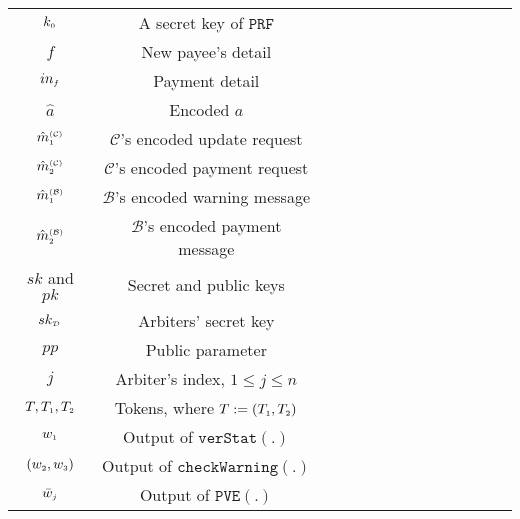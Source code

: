 \begin{table*}[!htbp]
\begin{scriptsize}
\begin{center}
{{\begin{tabular}{|c|c|c|c|c|c|c|c|c|c|c|c|c|c|}
\cellcolor{gray!20}\scriptsize$ k_{\scriptscriptstyle 0}$ &\cellcolor{gray!20}\scriptsize   A secret key of $\mathtt{PRF}$\\ 
%               
\cellcolor{white!20}\scriptsize$f$ &\cellcolor{white!20}\scriptsize New payee’s detail  \\ 
\cellcolor{gray!20}\scriptsize$in_{\scriptscriptstyle f}$ &\cellcolor{gray!20}\scriptsize Payment detail \\ 
%
  \cellcolor{white!20}\scriptsize$\hat a$ &\cellcolor{white!20}\scriptsize Encoded $a$ \\     
%
\cellcolor{gray!20}\scriptsize$\hat {m}^{\scriptscriptstyle(\mathcal{C})}_{\scriptscriptstyle 1}$ &\cellcolor{gray!20}\scriptsize $\mathcal{C}$'s encoded update request\\     
%
\cellcolor{white!20}\scriptsize$\hat {m}^{\scriptscriptstyle(\mathcal{C})}_{\scriptscriptstyle 2}$ &\cellcolor{white!20}\scriptsize $\mathcal{C}$'s encoded payment request\\     
%      
\cellcolor{gray!20}\scriptsize$\hat {m}^{\scriptscriptstyle(\mathcal{B})}_{\scriptscriptstyle 1}$ &\cellcolor{gray!20}\scriptsize $\mathcal{B}$'s encoded warning message\\     
%
\cellcolor{white!20}\scriptsize$\hat {m}^{\scriptscriptstyle(\mathcal{B})}_{\scriptscriptstyle 2}$ &\cellcolor{white!20}\scriptsize $\mathcal{B}$'s encoded payment message\\     
%          
     \cellcolor{gray!20}\scriptsize$sk$ and $pk$ &\cellcolor{gray!20}\scriptsize Secret  and public keys\\     
%
   \cellcolor{white!20}\scriptsize$sk_{\scriptscriptstyle\mathcal{D}}$ &\cellcolor{white!20}\scriptsize Arbiters' secret key\\     
%    
\cellcolor{gray!20}\scriptsize$pp$ &\cellcolor{gray!20}\scriptsize Public parameter\\  
%
\cellcolor{white!20}\scriptsize$j$ &\cellcolor{white!20}\scriptsize  Arbiter's index,  $1\leq j\leq n$ \\ 
%
\cellcolor{gray!20}\scriptsize$T, T_{\scriptscriptstyle 1},T_{\scriptscriptstyle 2}$ &\cellcolor{gray!20}\scriptsize  Tokens, where  $T:=( T_{\scriptscriptstyle 1},T_{\scriptscriptstyle 2})$\\ 
%
\cellcolor{white!20}\scriptsize$w_{\scriptscriptstyle 1}$ &\cellcolor{white!20}\scriptsize  Output of $\mathtt{verStat}(.)$\\ 
%
\cellcolor{gray!20}\scriptsize$(w_{\scriptscriptstyle 2},w_{\scriptscriptstyle 3})$ &\cellcolor{gray!20}\scriptsize  Output of $\mathtt{checkWarning}(.)$\\ 
%
\cellcolor{white!20}\scriptsize$\bar{w}_{\scriptscriptstyle j}$ &\cellcolor{white!20}\scriptsize  Output of $\mathtt{PVE}(.)$\\ 

\end{tabular}}}
\end{center}
\end{scriptsize}
\end{table*}
